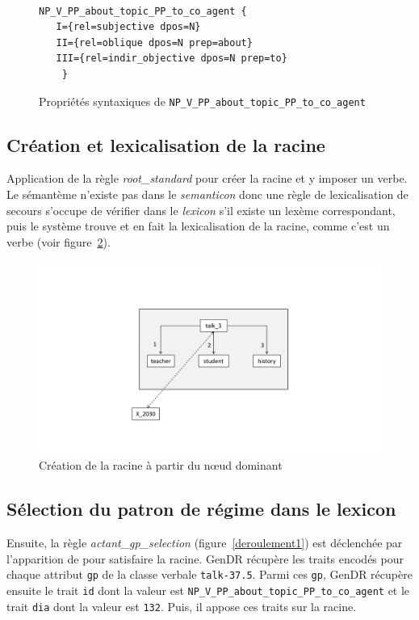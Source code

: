 \begin{figure}[htb]
\begin{lstlisting}[language=mate]

NP_V_PP_about_topic_PP_to_co_agent {
   I={rel=subjective dpos=N}
   II={rel=oblique dpos=N prep=about}
   III={rel=indir_objective dpos=N prep=to}
	}
\end{lstlisting}
  \caption{Propriétés syntaxiques de \texttt{NP\_V\_PP\_about\_topic\_PP\_to\_co\_agent}}
	\label{gpexemple}
\end{figure}

\subsection{Création et lexicalisation de la racine}
Application de la règle \emph{root\_standard} pour créer la racine et y imposer un verbe. Le sémantème  n'existe pas dans le \emph{semanticon} donc une règle de lexicalisation de secours s'occupe de vérifier dans le \emph{lexicon} s'il existe un lexème correspondant, puis le système trouve  et en fait la lexicalisation de la racine, comme c'est un verbe (voir figure~\ref{deroulement0}).

\begin{figure}[htb]
	\centering
	\includegraphics[width=1\textwidth, trim = {0cm 3.4cm 0cm 4.7cm},clip]{ch6/figs/root_implem.pdf}
	\caption{Création de la racine à partir du n\oe{}ud dominant}
	\label{deroulement0}
\end{figure}

\subsection{Sélection du patron de régime dans le lexicon}
Ensuite, la règle \emph{actant\_gp\_selection} (figure~\ref{deroulement1}) est déclenchée par l'apparition de  pour satisfaire la racine. GenDR récupère les traits encodés pour chaque attribut \texttt{gp} de la classe verbale \texttt{talk-37.5}. Parmi ces \texttt{gp}, GenDR récupère ensuite le trait \texttt{id} dont la valeur est \texttt{NP\_V\_PP\_about\_topic\_PP\_to\_co\_agent} et le trait \texttt{dia} dont la valeur est \texttt{132}. Puis, il appose ces traits sur la racine.

